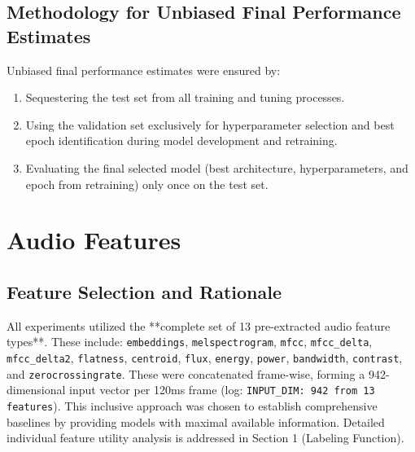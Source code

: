 \documentclass[11pt, a4paper]{article}
\newcommand{\code}[1]{\texttt{#1}}
\begin{document}
\subsection{Methodology for Unbiased Final Performance Estimates}
Unbiased final performance estimates were ensured by:
\begin{enumerate}
    \item Sequestering the test set from all training and tuning processes.
    \item Using the validation set exclusively for hyperparameter selection and best epoch identification during model development and retraining.
    \item Evaluating the final selected model (best architecture, hyperparameters, and epoch from retraining) only once on the test set.
\end{enumerate}

\section{Audio Features}
\label{sec:audio_features}

\subsection{Feature Selection and Rationale}
All experiments utilized the **complete set of 13 pre-extracted audio feature types**. These include: \code{embeddings}, \code{melspectrogram}, \code{mfcc}, \code{mfcc\_delta}, \code{mfcc\_delta2}, \code{flatness}, \code{centroid}, \code{flux}, \code{energy}, \code{power}, \code{bandwidth}, \code{contrast}, and \code{zerocrossingrate}. These were concatenated frame-wise, forming a 942-dimensional input vector per 120ms frame (log: \code{INPUT\_DIM: 942 from 13 features}). This inclusive approach was chosen to establish comprehensive baselines by providing models with maximal available information. Detailed individual feature utility analysis is addressed in Section 1 (Labeling Function).
\end{document}
